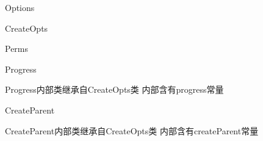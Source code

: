 \begin{XeClass}{Options}
\begin{XeInnerClass}{CreateOpts}
\begin{XeInnerClass}{Perms}
    \end{XeInnerClass}
    \begin{XeInnerClass}{Progress}
       
 Progress内部类继承自CreateOpts类
 内部含有progress常量

    \end{XeInnerClass}
    \begin{XeInnerClass}{CreateParent}
       
 CreateParent内部类继承自CreateOpts类
 内部含有createParent常量

    \end{XeInnerClass}
  \end{XeInnerClass}
\end{XeClass}
